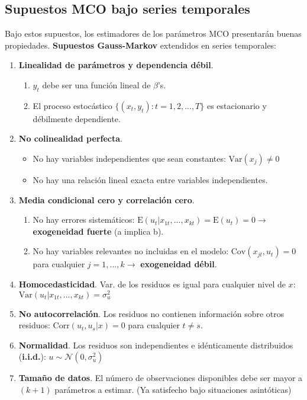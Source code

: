 \documentclass[10pt, a4paper, landscape]{extarticle}
\newcommand{\E}{\mathrm{E}}
\newcommand{\Var}{\mathrm{Var}}
\newcommand{\Cov}{\mathrm{Cov}}
\newcommand{\Corr}{\mathrm{Corr}}
\begin{document}
\begin{multicols}{3}
	\subsection*{Supuestos MCO bajo series temporales}
		Bajo estos supuestos, los estimadores de los parámetros MCO presentarán buenas propiedades. \textbf{Supuestos Gauss-Markov} extendidos en series temporales:
		\begin{enumerate}[leftmargin=*, label=st\arabic*.]
			\item \textbf{Linealidad de parámetros y dependencia débil}.
			\begin{enumerate}[leftmargin=*, label=\alph*.]
				\item $y_t$ debe ser una función lineal de $\beta$'s.
				\item El proceso estocástico $\lbrace(x_t, y_t): t = 1, 2, ..., T\rbrace$ es estacionario y débilmente dependiente.
			\end{enumerate} 
			\item \textbf{No colinealidad perfecta}.
			\begin{itemize}[leftmargin=*]
				\item No hay variables independientes que sean constantes: $\Var(x_j) \neq 0$
				\item No hay una relación lineal exacta entre variables independientes.
			\end{itemize}
			\item \textbf{Media condicional cero y correlación cero}.
			\begin{enumerate}[leftmargin=*, label=\alph*.]
				\item No hay errores sistemáticos: $\E(u_t | x_{1t}, ..., x_{kt}) = \E(u_t) = 0 \rightarrow$ \textbf{exogeneidad fuerte} (a implica b).
				\item No hay variables relevantes no incluidas en el modelo: $\Cov(x_{jt} , u_t) = 0$ para cualquier $j = 1, ..., k \rightarrow$ \textbf{exogeneidad débil}.
			\end{enumerate}
			\item \textbf{Homocedasticidad}. Var. de los residuos es igual para cualquier nivel de $x$: $\Var(u_t | x_{1t}, ..., x_{kt}) = \sigma^2_u$
			\item \textbf{No autocorrelación}. Los residuos no contienen información sobre otros residuos: $\Corr(u_t, u_s | x) = 0$ para cualquier $t \neq s$.
			\item \textbf{Normalidad}. Los residuos son independientes e idénticamente distribuidos (\textbf{i.i.d.}): $u \sim \mathcal{N}(0,\sigma^2_u)$
			\item \textbf{Tamaño de datos}. El número de observaciones disponibles debe ser mayor a $(k + 1)$ parámetros a estimar. (Ya satisfecho bajo situaciones asintóticas)
		\end{enumerate}	

\end{multicols}
\end{document}
